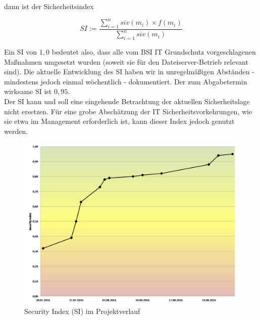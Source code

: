 dann ist der Sicherheitsindex

\begin{center}
\begin{equation}
SI:=\frac{\sum_{i=1}^n siv(m_i)\times f(m_i)}{\sum_{i=1}^{n}siv(m_i)}
\end{equation}
\end{center}

Ein SI von $1,0$ bedeutet also, dass alle vom BSI IT Grundschutz vorgeschlagenen Maßnahmen umgesetzt wurden (soweit sie für den Dateiserver-Betrieb relevant sind). Die aktuelle Entwicklung des SI haben wir in unregelmäßigen Abständen - mindestens jedoch einmal wöchentlich - dokumentiert. Der zum Abgabetermin wirksame SI ist $0,95$.\\

Der SI kann und soll eine eingehende Betrachtung der aktuellen Sicherheitslage nicht ersetzen. Für eine grobe Abschätzung der IT Sicherheitsvorkehrungen, wie sie etwa im Management erforderlich ist, kann dieser Index jedoch genutzt werden.

\begin{figure}[hbt!]
		\includegraphics[scale=0.66]{images/si.png}
	\caption{Security Index (SI) im Projektverlauf}
	\label{img:si}
\end{figure}

